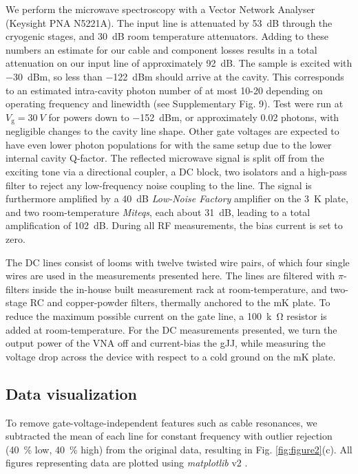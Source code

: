We perform the microwave spectroscopy with a Vector Network Analyser (Keysight PNA N5221A).
The input line is attenuated by \SI{53}{dB} through the cryogenic stages, and \SI{30}{dB} room temperature attenuators.
Adding to these numbers an estimate for our cable and component losses results in a total attenuation on our input line of approximately \SI{92}{dB}.
The sample is excited with \SI{-30}{dBm}, so less than \SI{-122}{dBm} should arrive at the cavity.
This corresponds to an estimated intra-cavity photon number of at most 10-20 depending on operating frequency and linewidth (see Supplementary Fig. 9).
Test were run at $V_\text{g} = \SI{30}{V}$ for powers down to \SI{-152}{dBm}, or approximately 0.02 photons, with negligible changes to the cavity line shape.
Other gate voltages are expected to have even lower photon populations for with the same setup due to the lower internal cavity Q-factor.
The reflected microwave signal is split off from the exciting tone via a directional coupler, a DC block, two isolators and a high-pass filter to reject any low-frequency noise coupling to the line.
The signal is furthermore amplified by a \SI{40}{dB} \textit{Low-Noise Factory} amplifier on the \SI{3}{K} plate, and two room-temperature \textit{Miteqs}, each about \SI{31}{dB}, leading to a total amplification of \SI{102}{dB}.
During all RF measurements, the bias current is set to zero.

The DC lines consist of looms with twelve twisted wire pairs, of which four single wires are used in the measurements presented here.
The lines are filtered with $\pi$-filters inside the in-house built measurement rack at room-temperature, and two-stage RC and copper-powder filters, thermally anchored to the mK plate.
To reduce the maximum possible current on the gate line, a \SI{100}{k\ohm} resistor is added at room-temperature.
For the DC measurements presented, we turn the output power of the VNA off and current-bias the gJJ, while measuring the voltage drop across the device with respect to a cold ground on the mK plate.

\subsection*{Data visualization}
To remove gate-voltage-independent features such as cable resonances, we subtracted the mean of each line for constant frequency with outlier rejection (\SI{40}{\percent} low, \SI{40}{\percent} high) from the original data, resulting in Fig. \ref{fig:figure2}(c).
All figures representing data are plotted using \textit{matplotlib} v2 \cite{hunter_matplotlib_2007}.

